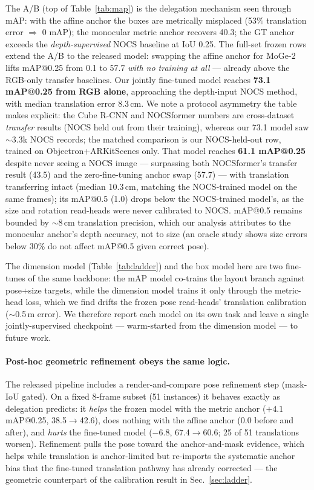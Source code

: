 \documentclass[runningheads]{llncs}
\begin{document}
The A/B (top of Table~\ref{tab:map}) is the delegation mechanism seen through mAP: with the
affine anchor the boxes are metrically misplaced (53\% translation error $\Rightarrow$ 0
mAP); the monocular metric anchor recovers 40.3; the GT anchor exceeds the
\emph{depth-supervised} NOCS baseline at IoU 0.25. The full-set frozen rows extend the
A/B to the released model: swapping the affine anchor for MoGe-2 lifts mAP@0.25 from 0.1
to 57.7 \emph{with no training at all} --- already above the RGB-only transfer baselines.
Our jointly fine-tuned model reaches
\textbf{73.1 mAP@0.25 from RGB alone}, approaching the depth-input NOCS method, with
median translation error 8.3\,cm. We note a protocol asymmetry the table makes explicit:
the Cube R-CNN and NOCSformer numbers are cross-dataset \emph{transfer} results (NOCS
held out from their training), whereas our 73.1 model saw $\sim$3.3k NOCS records; the
matched comparison is our NOCS-held-out row, trained on Objectron+ARKitScenes only.
That model reaches \textbf{61.1 mAP@0.25} despite never seeing a NOCS image ---
surpassing both NOCSformer's transfer result (43.5) and the zero-fine-tuning anchor swap
(57.7) --- with translation transferring intact (median 10.3\,cm, matching the
NOCS-trained model on the same frames); its mAP@0.5 (1.0) drops below the NOCS-trained
model's, as the size and rotation read-heads were never calibrated to NOCS.
mAP@0.5 remains bounded by $\sim$8\,cm translation precision, which our analysis
attributes to the monocular anchor's depth accuracy, not to size (an oracle study shows
size errors below 30\% do not affect mAP@0.5 given correct pose).

The dimension model (Table~\ref{tab:ladder}) and the box model here are two fine-tunes of
the same backbone: the mAP model co-trains the layout branch against pose+size targets,
while the dimension model trains it only through the metric-head loss, which we find
drifts the frozen pose read-heads' translation calibration ($\sim$0.5\,m error). We
therefore report each model on its own task and leave a single jointly-supervised
checkpoint --- warm-started from the dimension model --- to future work.

\paragraph{Post-hoc geometric refinement obeys the same logic.}
The released pipeline includes a render-and-compare pose refinement step (mask-IoU
gated). On a fixed 8-frame subset (51 instances) it behaves exactly as delegation
predicts: it \emph{helps} the frozen model with the metric anchor ($+4.1$ mAP@0.25,
38.5$\to$42.6), does nothing with the affine anchor (0.0 before and after), and
\emph{hurts} the fine-tuned model ($-6.8$, 67.4$\to$60.6; 25 of 51 translations worsen).
Refinement pulls the pose toward the anchor-and-mask evidence, which helps while
translation is anchor-limited but re-imports the systematic anchor bias that the
fine-tuned translation pathway has already corrected --- the geometric counterpart of
the calibration result in Sec.~\ref{sec:ladder}.
\end{document}
